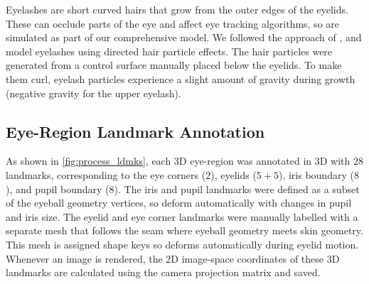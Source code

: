 Eyelashes are short curved hairs that grow from the outer edges of the eyelids.
These can occlude parts of the eye and affect eye tracking algorithms, so are simulated as part of our comprehensive model.
We followed the approach of \citet{swirski2014rendering}, and model eyelashes using directed hair particle effects.
The hair particles were generated from a control surface manually placed below the eyelids.
To make them curl, eyelash particles experience a slight amount of gravity during growth (negative gravity for the upper eyelash).

\subsection{Eye-Region Landmark Annotation}

As shown in \autoref{fig:process_ldmks}, each 3D eye-region was annotated in 3D with $28$ landmarks, corresponding to the eye corners ($2$), eyelids ($5\!+\!5$), iris boundary ($8$), and pupil boundary ($8$).
The iris and pupil landmarks were defined as a subset of the eyeball geometry vertices, so deform automatically with changes in pupil and iris size.
The eyelid and eye corner landmarks were manually labelled with a separate mesh that follows the seam where eyeball geometry meets skin geometry.
This mesh is assigned shape keys so deforms automatically during eyelid motion.
%
Whenever an image is rendered, the 2D image-space coordinates of these 3D landmarks are calculated using the camera projection matrix and saved.